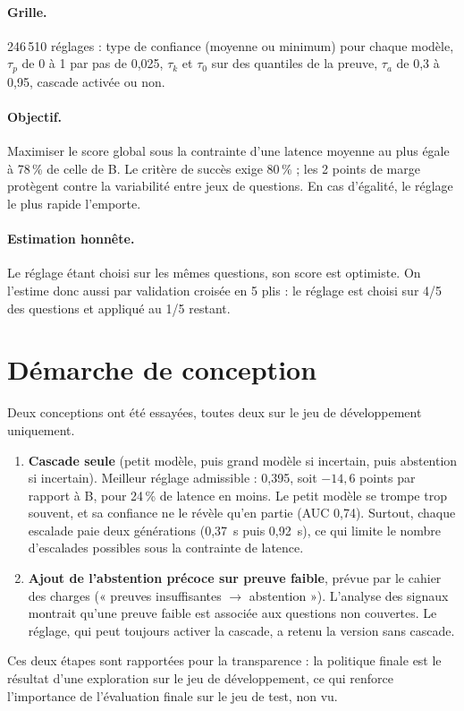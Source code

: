 \documentclass[11pt,a4paper]{article}
\begin{document}
\paragraph{Grille.} 246\,510 réglages : type de confiance (moyenne ou minimum) pour chaque modèle,
$\tau_p$ de 0 à 1 par pas de 0,025, $\tau_k$ et $\tau_0$ sur des quantiles de la preuve, $\tau_a$ de 0,3 à
0,95, cascade activée ou non.

\paragraph{Objectif.} Maximiser le score global sous la contrainte d'une latence moyenne au plus égale à
78\,\% de celle de B. Le critère de succès exige 80\,\% ; les 2 points de marge protègent contre la
variabilité entre jeux de questions. En cas d'égalité, le réglage le plus rapide l'emporte.

\paragraph{Estimation honnête.} Le réglage étant choisi sur les mêmes questions, son score est optimiste.
On l'estime donc aussi par validation croisée en 5 plis : le réglage est choisi sur 4/5 des questions et
appliqué au 1/5 restant.

\section{Démarche de conception}\label{sec:demarche}

Deux conceptions ont été essayées, toutes deux sur le jeu de développement uniquement.
\begin{enumerate}
\item \textbf{Cascade seule} (petit modèle, puis grand modèle si incertain, puis abstention si
incertain). Meilleur réglage admissible : 0,395, soit $-14{,}6$ points par rapport à B, pour 24\,\% de
latence en moins. Le petit modèle se trompe trop souvent, et sa confiance ne le révèle qu'en partie
(AUC 0,74). Surtout, chaque escalade paie deux générations (0,37~s puis 0,92~s), ce qui limite le nombre
d'escalades possibles sous la contrainte de latence.
\item \textbf{Ajout de l'abstention précoce sur preuve faible}, prévue par le cahier des charges
(« preuves insuffisantes $\rightarrow$ abstention »). L'analyse des signaux montrait qu'une preuve faible
est associée aux questions non couvertes. Le réglage, qui peut toujours activer la cascade, a retenu la
version sans cascade.
\end{enumerate}
Ces deux étapes sont rapportées pour la transparence : la politique finale est le résultat d'une
exploration sur le jeu de développement, ce qui renforce l'importance de l'évaluation finale sur le jeu
de test, non vu.
\end{document}
